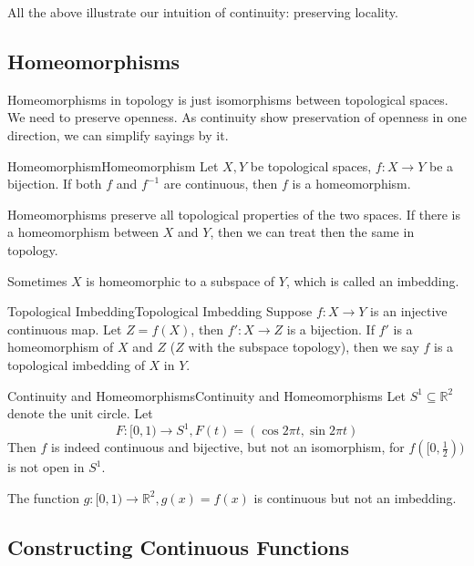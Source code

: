 \documentclass[../main.tex]{subfiles}
\begin{document}
All the above illustrate our intuition of continuity: preserving locality.

\subsection{Homeomorphisms}
Homeomorphisms in topology is just isomorphisms between topological spaces. We need to preserve openness. As continuity show preservation of openness in one direction, we can simplify sayings by it.

\begin{definition}{Homeomorphism}{Homeomorphism}
Let $X, Y$ be topological spaces, $f:X \rightarrow Y$ be a bijection. If both $f$ and $f^{-1}$ are continuous, then $f$ is a homeomorphism.
\end{definition}

Homeomorphisms preserve all topological properties of the two spaces. If there is a homeomorphism between $X$ and $Y$, then we can treat then the same in topology.

Sometimes $X$ is homeomorphic to a subspace of $Y$, which is called an imbedding.

\begin{definition}{Topological Imbedding}{Topological Imbedding}
Suppose $f:X \rightarrow Y$ is an injective continuous map. Let $Z = f(X)$, then $f': X \rightarrow Z$ is a bijection. If $f'$ is a homeomorphism of $X$ and $Z$ ($Z$ with the subspace topology), then we say $f$ is a topological imbedding of $X$ in $Y$.
\end{definition}

\begin{example}{Continuity and Homeomorphisms}{Continuity and Homeomorphisms}
Let $S^1 \subseteq \mathbb{R}^2$ denote the unit circle. Let
\begin{equation*}
F: [0,1) \rightarrow S^1, F(t) = (\cos 2 \pi t,\sin 2\pi t)
\end{equation*}
Then $f$ is indeed continuous and bijective, but not an isomorphism, for $f([0,\frac{1}{2}))$ is not open in $S^1$.

The function $g: [0,1) \rightarrow \mathbb{R}^2,g(x)=f(x)$ is continuous but not an imbedding.
\end{example}

\subsection{Constructing Continuous Functions}
\end{document}
